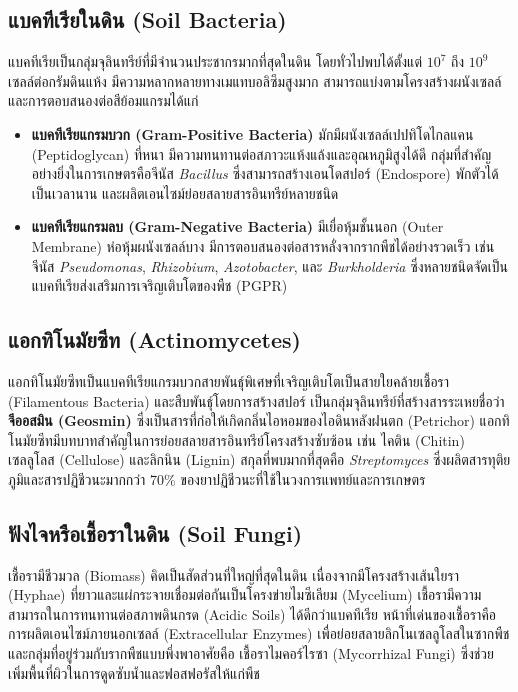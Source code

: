 \subsection{แบคทีเรียในดิน (Soil Bacteria)}
แบคทีเรียเป็นกลุ่มจุลินทรีย์ที่มีจำนวนประชากรมากที่สุดในดิน โดยทั่วไปพบได้ตั้งแต่ $10^7$ ถึง $10^9$ เซลล์ต่อกรัมดินแห้ง มีความหลากหลายทางเมแทบอลิซึมสูงมาก สามารถแบ่งตามโครงสร้างผนังเซลล์และการตอบสนองต่อสีย้อมแกรมได้แก่
\begin{itemize}
    \item \textbf{แบคทีเรียแกรมบวก (Gram-Positive Bacteria)} มักมีผนังเซลล์เปปทิโดไกลแคน (Peptidoglycan) ที่หนา มีความทนทานต่อสภาวะแห้งแล้งและอุณหภูมิสูงได้ดี กลุ่มที่สำคัญอย่างยิ่งในการเกษตรคือจีนัส \textit{Bacillus} ซึ่งสามารถสร้างเอนโดสปอร์ (Endospore) พักตัวได้เป็นเวลานาน และผลิตเอนไซม์ย่อยสลายสารอินทรีย์หลายชนิด
    \item \textbf{แบคทีเรียแกรมลบ (Gram-Negative Bacteria)} มีเยื่อหุ้มชั้นนอก (Outer Membrane) ห่อหุ้มผนังเซลล์บาง มีการตอบสนองต่อสารหลั่งจากรากพืชได้อย่างรวดเร็ว เช่น จีนัส \textit{Pseudomonas}, \textit{Rhizobium}, \textit{Azotobacter}, และ \textit{Burkholderia} ซึ่งหลายชนิดจัดเป็นแบคทีเรียส่งเสริมการเจริญเติบโตของพืช (PGPR)
\end{itemize}

\subsection{แอกทิโนมัยซีท (Actinomycetes)}
แอกทิโนมัยซีทเป็นแบคทีเรียแกรมบวกสายพันธุ์พิเศษที่เจริญเติบโตเป็นสายใยคล้ายเชื้อรา (Filamentous Bacteria) และสืบพันธุ์โดยการสร้างสปอร์ เป็นกลุ่มจุลินทรีย์ที่สร้างสารระเหยชื่อว่า \textbf{จีออสมิน (Geosmin)} ซึ่งเป็นสารที่ก่อให้เกิดกลิ่นไอหอมของไอดินหลังฝนตก (Petrichor) แอกทิโนมัยซีทมีบทบาทสำคัญในการย่อยสลายสารอินทรีย์โครงสร้างซับซ้อน เช่น ไคติน (Chitin) เซลลูโลส (Cellulose) และลิกนิน (Lignin) สกุลที่พบมากที่สุดคือ \textit{Streptomyces} ซึ่งผลิตสารทุติยภูมิและสารปฏิชีวนะมากกว่า 70\% ของยาปฏิชีวนะที่ใช้ในวงการแพทย์และการเกษตร

\subsection{ฟังไจหรือเชื้อราในดิน (Soil Fungi)}
เชื้อรามีชีวมวล (Biomass) คิดเป็นสัดส่วนที่ใหญ่ที่สุดในดิน เนื่องจากมีโครงสร้างเส้นใยรา (Hyphae) ที่ยาวและแผ่กระจายเชื่อมต่อกันเป็นโครงข่ายไมซีเลียม (Mycelium) เชื้อรามีความสามารถในการทนทานต่อสภาพดินกรด (Acidic Soils) ได้ดีกว่าแบคทีเรีย หน้าที่เด่นของเชื้อราคือการผลิตเอนไซม์ภายนอกเซลล์ (Extracellular Enzymes) เพื่อย่อยสลายลิกโนเซลลูโลสในซากพืช และกลุ่มที่อยู่ร่วมกับรากพืชแบบพึ่งพาอาศัยคือ เชื้อราไมคอร์ไรซา (Mycorrhizal Fungi) ซึ่งช่วยเพิ่มพื้นที่ผิวในการดูดซับน้ำและฟอสฟอรัสให้แก่พืช

